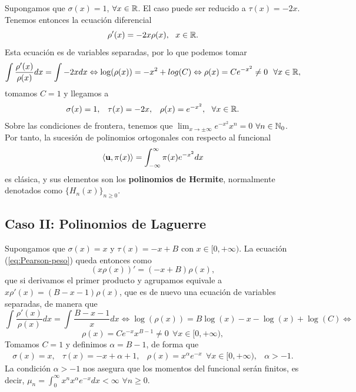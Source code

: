 Supongamos que $\sigma(x)=1$, $\forall x\in \mathbb{R}$. El caso puede ser reducido a $\tau(x)=-2x$. Tenemos entonces la ecuación diferencial
$$
\rho'(x) = -2x \rho(x), \ \ x\in\mathbb{R}.
$$
Esta ecuación es de variables separadas, por lo que podemos tomar
$$
\int \dfrac{\rho'(x)}{\rho(x)}dx = \int -2x dx \Leftrightarrow \log(\rho(x)) = -x^2 + log(C) \Leftrightarrow \rho(x) = C e^{-x^2} \neq 0 \ \ \forall x \in \mathbb{R},
$$
tomamos $C=1$ y llegamos a 
\begin{equation}
    \label{eq:parametros-hermite}
    \begin{array}{ccc}
        \sigma(x)=1, & \tau(x)=-2x, & \rho(x) = e^{-x^2}, \ \ \forall x \in \R.
    \end{array}
\end{equation}
Sobre las condiciones de frontera, tenemos que $\displaystyle\lim_{x\rightarrow\pm\infty} e^{-x^2}x^n = 0$ $\forall n\in\mathbb{N}_0$. Por tanto, la sucesión de polinomios ortogonales con respecto al funcional
\begin{equation}
    \label{eq:func-hermite}
    \left\langle \mathbf{u} , \pi(x) \right\rangle = \int_{-\infty}^\infty \pi(x)e^{-x^2}dx
\end{equation}
es clásica, y sus elementos son los \textbf{polinomios de Hermite}, normalmente denotados como $\{H_n(x)\}_{n\geq 0}$.

\subsection{Caso II: Polinomios de Laguerre}

Supongamos que $\sigma(x) = x$ y $\tau(x)=-x+B$ con $x\in[0,+\infty)$. La ecuación (\ref{eq:Pearson-peso}) queda entonces como
$$
(x\rho(x))'=(-x+B)\rho(x),
$$
que si derivamos el primer producto y agrupamos equivale a $x\rho'(x)=(B-x-1)\rho(x)$, que es de nuevo una ecuación de variables separadas, de manera que
$$
\int \dfrac{\rho'(x)}{\rho(x)}dx = \int \dfrac{B-x-1}{x}dx \Leftrightarrow \log(\rho(x)) = B\log(x)-x-\log(x) + \log(C)\Leftrightarrow $$ $$
 \rho(x) = Ce^{-x}x^{B-1}\neq 0 \ \ \forall x\in[0,+\infty),
$$
Tomamos $C=1$ y definimos $\alpha = B-1$, de forma que
\begin{equation}
    \label{eq:parametros-laguerre}
    \begin{array}{cccc}
        \sigma(x)=x, & \tau(x)=-x+\alpha+1, & \rho(x) = x^{\alpha} e^{-x}\ \ \forall x \in[0,+\infty), & \alpha > -1.
    \end{array}
\end{equation}
La condición $\alpha > -1$ nos asegura que los momentos del funcional serán finitos, es decir, $\mu_n =\int_0^\infty x^nx^{\alpha} e^{-x}dx <\infty$ $\forall n\geq 0$.

